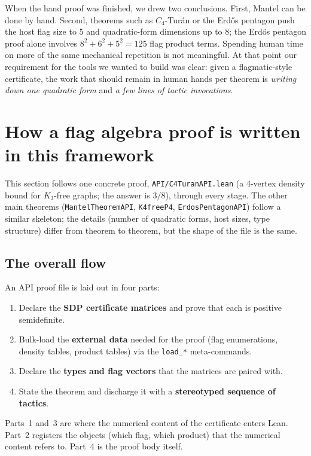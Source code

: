 \documentclass[11pt]{article}
\begin{document}
When the hand proof was finished, we drew two conclusions. First, Mantel can
be done by hand. Second, theorems such as $C_4$-Tur\'an or the Erd\H{o}s
pentagon push the host flag size to $5$ and quadratic-form dimensions up to
$8$; the Erd\H{o}s pentagon proof alone involves $8^2 + 6^2 + 5^2 = 125$
flag product terms. Spending human time on more of the same mechanical
repetition is not meaningful. At that point our requirement for the tools
we wanted to build was clear: given a flagmatic-style certificate, the
work that should remain in human hands per theorem is \emph{writing down
one quadratic form} and \emph{a few lines of tactic invocations}.

\section{How a flag algebra proof is written in this framework}

This section follows one concrete proof, \texttt{API/C4TuranAPI.lean}
(a 4-vertex density bound for $K_3$-free graphs; the answer is $3/8$),
through every stage. The other main theorems
(\texttt{MantelTheoremAPI}, \texttt{K4freeP4},
\texttt{ErdosPentagonAPI}) follow a similar skeleton; the details (number
of quadratic forms, host sizes, type structure) differ from theorem to
theorem, but the shape of the file is the same.

\subsection{The overall flow}

An API proof file is laid out in four parts:

\begin{enumerate}
  \item Declare the \textbf{SDP certificate matrices} and prove that each is
    positive semidefinite.
  \item Bulk-load the \textbf{external data} needed for the proof
    (flag enumerations, density tables, product tables) via the
    \texttt{load\_*} meta-commands.
  \item Declare the \textbf{types and flag vectors} that the matrices are
    paired with.
  \item State the theorem and discharge it with a \textbf{stereotyped
    sequence of tactics}.
\end{enumerate}

Parts~1 and~3 are where the numerical content of the certificate enters
Lean. Part~2 registers the objects (which flag, which product) that the
numerical content refers to. Part~4 is the proof body itself.
\end{document}
